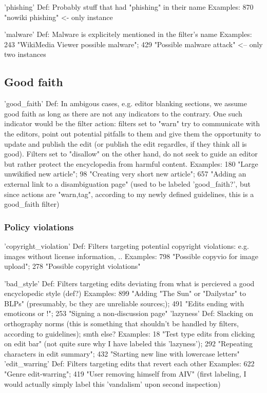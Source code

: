 'phishing'
  Def: Probably stuff that had "phishing" in their name
  Examples: 870 "nowiki phishing" <- only instance

'malware'
  Def: Malware is explicitely mentioned in the filter's name %
  Examples: 243 "WikiMedia Viewer possible malware"; 429 "Possible malware attack" <-- only two instances

\subsection{Good faith}

'good\_faith'
  Def: In ambigous cases, e.g. editor blanking sections, we assume good faith as long as there are not any indicators to the contrary. One such indicator would be the filter action: filters set to "warn" try to communicate with the editors, point out potential pitfalls to them and give them the opportunity to update and publish the edit (or publish the edit regardles, if they think all is good). Filters set to "disallow" on the other hand, do not seek to guide an editor but rather protect the encyclopedia from harmful content.
  Examples: 180	"Large unwikified new article"; 98 "Creating very short new article"; 657 "Adding an external link to a disambiguation page" (used to be labeled 'good\_faith?', but since actions are "warn,tag", according to my newly defined guidelines, this is a good\_faith filter)

\subsubsection{Policy violations}

'copyright\_violation'
  Def: Filters targeting potential copyright violations: e.g. images without license information, ..
  Examples: 798 "Possible copyvio for image upload"; 278 "Possible copyright violations"

'bad\_style'
  Def: Filters targeting edits deviating from what is percieved a good encyclopedic style (def?)
  Examples: 899 "Adding "The Sun" or "Dailystar" to BLPs" (presumably, bc they are unreliable sources;); 491 "Edits ending with emoticons or !"; 253 "Signing a non-discussion page"
'lazyness'
  Def: Slacking on orthography norms (this is something that shouldn't be handled by filters, according to guidelines); smth else?
  Examples: 18 "Test type edits from clicking on edit bar" (not quite sure why I have labeled this 'lazyness'); 292 "Repeating characters in edit summary"; 432 "Starting new line with lowercase letters"
'edit\_warring'
  Def: Filters targeting edits that revert each other
  Examples: 622 "Genre edit-warring"; 419 "User removing himself from AIV" (first labeling, I would actually simply label this 'vandalism' upon second inspection)

